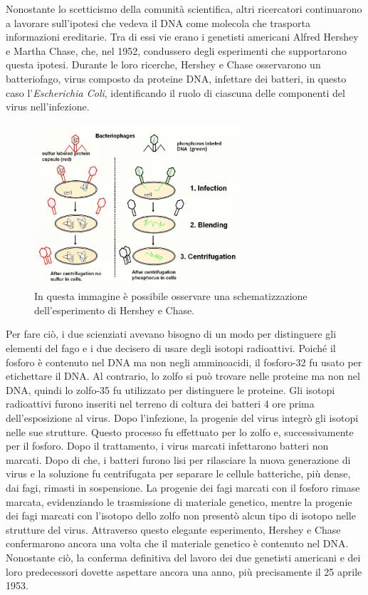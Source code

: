 \documentclass[11pt]{report}
\begin{document}
	Nonostante lo scetticismo della comunità scientifica, altri ricercatori continuarono a lavorare sull'ipotesi che vedeva il DNA come molecola che trasporta informazioni ereditarie. Tra di essi vie erano i genetisti americani Alfred Hershey e Martha Chase, che, nel 1952, condussero degli esperimenti che supportarono questa ipotesi. Durante le loro ricerche, Hershey e Chase osservarono un batteriofago, virus composto da proteine DNA, infettare dei batteri, in questo caso l'\textit{Escherichia Coli}, identificando il ruolo di ciascuna delle componenti del virus nell'infezione.
	\begin{figure}
		\includegraphics[width=3in]{esperimento-hershey.png}
		\caption{{\small In questa immagine è possibile osservare una schematizzazione dell'esperimento di Hershey e Chase.}}
	\end{figure}
	 Per fare ciò, i due scienziati avevano bisogno di un modo per distinguere gli elementi del fago e i due decisero di usare degli isotopi radioattivi. Poiché il fosforo è contenuto nel DNA ma non negli amminoacidi, il fosforo-32 fu usato per etichettare il DNA. Al contrario, lo zolfo si può trovare nelle proteine ma non nel DNA, quindi lo zolfo-35 fu utilizzato per distinguere le proteine. Gli isotopi radioattivi furono inseriti nel terreno di coltura dei batteri 4 ore prima dell'esposizione al virus. Dopo l'infezione, la progenie del virus integrò gli isotopi nelle sue strutture. Questo processo fu effettuato per lo zolfo e, successivamente per il fosforo. Dopo il trattamento, i virus marcati infettarono batteri non marcati. Dopo di che, i batteri furono lisi per rilasciare la nuova generazione di virus e la soluzione fu centrifugata per separare le cellule batteriche, più dense, dai fagi, rimasti in sospensione. La progenie dei fagi marcati con il fosforo rimase marcata, evidenziando le trasmissione di materiale genetico, mentre la progenie dei fagi marcati con l'isotopo dello zolfo non presentò alcun tipo di isotopo nelle strutture del virus.\cite{hershey1952independent} Attraverso questo elegante esperimento, Hershey e Chase confermarono ancora una volta che il materiale genetico è contenuto nel DNA. Nonostante ciò, la conferma definitiva del lavoro dei due genetisti americani e dei loro predecessori dovette aspettare ancora una anno, più precisamente il 25 aprile 1953.
	 
\end{document}
